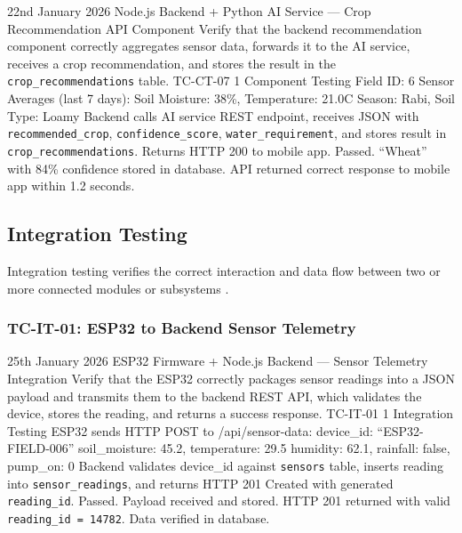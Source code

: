 \testcase%
{22nd January 2026}%
{Node.js Backend + Python AI Service --- Crop
Recommendation API Component}%
{Verify that the backend recommendation component correctly
aggregates sensor data, forwards it to the AI service,
receives a crop recommendation, and stores the result in
the \texttt{crop\_recommendations} table.}%
{TC-CT-07}%
{1}%
{Component Testing}%
{Field ID: 6 \newline
Sensor Averages (last 7 days): \newline
Soil Moisture: 38\%, Temperature: 21.0\textdegree{}C \newline
Season: Rabi, Soil Type: Loamy}%
{Backend calls AI service REST endpoint, receives JSON
with \texttt{recommended\_crop}, \texttt{confidence\_score},
\texttt{water\_requirement}, and stores result in
\texttt{crop\_recommendations}. Returns HTTP 200 to mobile
app.}%
{Passed. ``Wheat'' with 84\% confidence stored in database.
API returned correct response to mobile app within 1.2
seconds.}

\subsection{Integration Testing}

Integration testing verifies the correct interaction and
data flow between two or more connected modules or
subsystems \cite{thilakarathne2023fields,
sommerville2016software}.

\subsubsection{TC-IT-01: ESP32 to Backend Sensor Telemetry}

\testcase%
{25th January 2026}%
{ESP32 Firmware + Node.js Backend --- Sensor Telemetry
Integration}%
{Verify that the ESP32 correctly packages sensor readings
into a JSON payload and transmits them to the backend REST
API, which validates the device, stores the reading, and
returns a success response.}%
{TC-IT-01}%
{1}%
{Integration Testing}%
{ESP32 sends HTTP POST to /api/sensor-data: \newline
device\_id: ``ESP32-FIELD-006'' \newline
soil\_moisture: 45.2, temperature: 29.5 \newline
humidity: 62.1, rainfall: false, pump\_on: 0}%
{Backend validates device\_id against \texttt{sensors}
table, inserts reading into \texttt{sensor\_readings}, and
returns HTTP 201 Created with generated
\texttt{reading\_id}.}%
{Passed. Payload received and stored. HTTP 201 returned
with valid \texttt{reading\_id = 14782}. Data verified in
database.}


